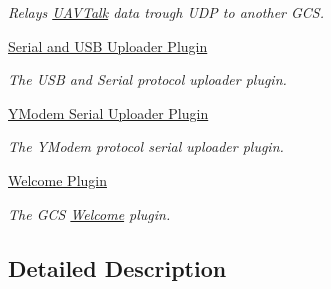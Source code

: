 \begin{DoxyCompactItemize}
\begin{DoxyCompactList}\small\item\em Relays \hyperlink{class_u_a_v_talk}{U\-A\-V\-Talk} data trough U\-D\-P to another G\-C\-S. \end{DoxyCompactList}\item 
\hyperlink{group___uploader}{Serial and U\-S\-B Uploader Plugin}
\begin{DoxyCompactList}\small\item\em The U\-S\-B and Serial protocol uploader plugin. \end{DoxyCompactList}\item 
\hyperlink{group___y_modem_uploader}{Y\-Modem Serial Uploader Plugin}
\begin{DoxyCompactList}\small\item\em The Y\-Modem protocol serial uploader plugin. \end{DoxyCompactList}\item 
\hyperlink{group___welcome_plugin}{Welcome Plugin}
\begin{DoxyCompactList}\small\item\em The G\-C\-S \hyperlink{namespace_welcome}{Welcome} plugin. \end{DoxyCompactList}\end{DoxyCompactItemize}


\subsection{Detailed Description}
